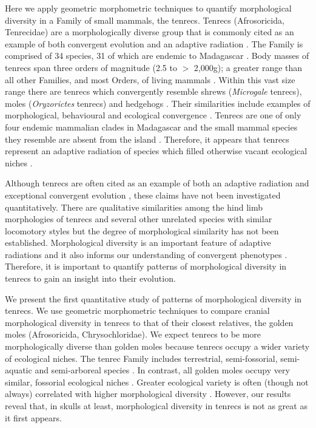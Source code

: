 \documentclass[12pt,a4paper]{article}
\begin{document}
	Here we apply geometric morphometric techniques to quantify morphological diversity in a Family of small mammals, the tenrecs. Tenrecs (Afrosoricida, Tenrecidae) are a morphologically diverse group that is commonly cited as an example of both convergent evolution and an adaptive radiation \citep{Soarimalala2011, Eisenberg1969}. The Family is comprised of 34 species, 31 of which are endemic to Madagascar \citep{Olson2013}. Body masses of tenrecs span three orders of magnitude (2.5 to $>$ 2,000g); a greater range than all other Families, and most Orders, of living mammals \citep{Olson2003}. Within this vast size range there are tenrecs which convergently resemble shrews (\textit{Microgale} tenrecs), moles (\textit{Oryzorictes} tenrecs) and hedgehogs \citep[\textit{Echinops} and \textit{Setifer} tenrecs,][]{Eisenberg1969}. Their similarities include examples of morphological, behavioural and ecological convergence \citep{Soarimalala2011}. Tenrecs are one of only four endemic mammalian clades in Madagascar and the small mammal species they resemble are absent from the island \citep{Garbutt1999}. Therefore, it appears that tenrecs represent an adaptive radiation of species which filled otherwise vacant ecological niches \citep{Soarimalala2011}.
	
	Although tenrecs are often cited as an example of both an adaptive radiation and exceptional convergent evolution \citep{Soarimalala2011, Eisenberg1969}, these claims have not been investigated quantitatively. There are qualitative similarities among the hind limb morphologies of tenrecs and several other unrelated species with similar locomotory styles \citep{Salton2009} but the degree of morphological similarity has not been established. Morphological diversity is an important feature of adaptive radiations \citep{Losos2010a} and it also informs our understanding of convergent phenotypes \citep{Muschick2012}. Therefore, it is important to quantify patterns of morphological diversity in tenrecs to gain an insight into their evolution. 
	
	We present the first quantitative study of patterns of morphological diversity in tenrecs. We use geometric morphometric techniques \citep{Rohlf1993} to compare cranial morphological diversity in tenrecs to that of their closest relatives, the golden moles (Afrosoricida, Chrysochloridae). 
	We expect tenrecs to be more morphologically diverse than golden moles because tenrecs occupy a wider variety of ecological niches. The tenrec Family includes terrestrial, semi-fossorial, semi-aquatic and semi-arboreal species \citep{Soarimalala2011}. In contrast, all golden moles occupy very similar, fossorial ecological niches \citep{Bronner1995}. Greater ecological variety is often (though not always) correlated with higher morphological diversity \citep{Losos2010a}. However, our results reveal that, in skulls at least, morphological diversity in tenrecs is not as great as it first appears.
	
\end{document}
